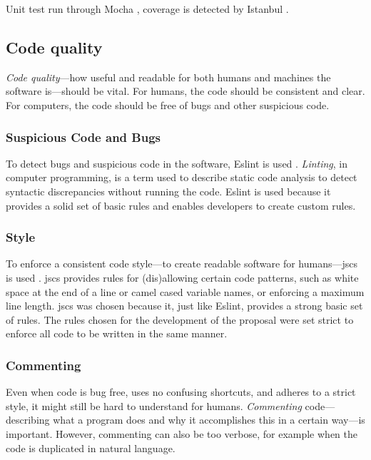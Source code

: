 Unit test run through Mocha \autocite{visionmedia/mocha-source-code},
  coverage is detected by Istanbul
  \autocite{gotwarlost/istanbul-source-code}.

\subsection{Code quality}\label{code-quality}

\emph{Code quality}---how useful and readable for both humans and machines
  the software is---should be vital. For humans, the code should be
  consistent and clear. For computers, the code should be free of bugs and
  other suspicious code.

\subsubsection{Suspicious Code and Bugs}\label{suspicious-code-and-bugs}

To detect bugs and suspicious code in the software, Eslint
  is used \autocite{eslint/eslint-source-code}.
\emph{Linting}, in computer programming, is a term used to describe static
  code analysis to detect syntactic discrepancies without running the code.
Eslint is used because it provides a solid set of basic rules and enables
  developers to create custom rules.

\subsubsection{Style}\label{style}

To enforce a consistent code style---to create readable software for
  humans---\acrshort{jscs} is used \autocite{mdevils/node-jscs-source-code}.
\acrshort{jscs} provides rules for (dis)allowing certain code patterns,
  such as white space at the end of a line or camel cased variable names,
  or enforcing a maximum line length.
\acrshort{jscs} was chosen because it, just like Eslint, provides a strong
  basic set of rules.
The rules chosen for the development of the proposal were set strict to
  enforce all code to be written in the same manner.

\subsubsection{Commenting}\label{commenting}

Even when code is bug free, uses no confusing shortcuts, and adheres to a
  strict style, it might still be hard to understand for humans.
\emph{Commenting} code---describing what a program does and why it
  accomplishes this in a certain way---is important.
However, commenting can also be too verbose, for example when the code is
  duplicated in natural language.

